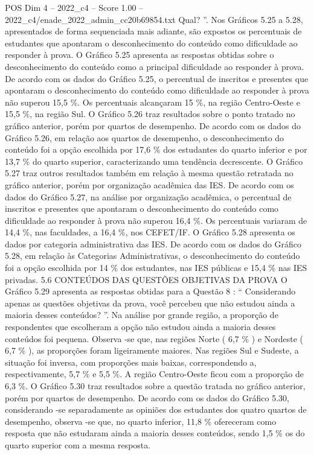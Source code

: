 \begin{textsample}{POS Dim 4 – 2022\_c4 – Score 1.00 – 2022\_c4/enade\_2022\_admin\_cc20b69854.txt}
Qual? ”.
Nos Gráficos 5.25 a 5.28, apresentados de forma sequenciada mais adiante, são expostos os percentuais de estudantes que apontaram o desconhecimento do conteúdo como dificuldade ao responder à prova.
O Gráfico 5.25 apresenta as respostas obtidas sobre o desconhecimento do conteúdo como a principal dificuldade ao responder à prova.
De acordo com os dados do Gráfico 5.25, o percentual de inscritos e presentes que apontaram o desconhecimento do conteúdo como dificuldade ao responder à prova não superou 15,5 \%.
Os percentuais alcançaram 15 \%, na região Centro-Oeste e 15,5 \%, na região Sul.
O Gráfico 5.26 traz resultados sobre o ponto tratado no gráfico anterior, porém por quartos de desempenho.
De acordo com os dados do Gráfico 5.26, em relação aos quartos de desempenho, o desconhecimento do conteúdo foi a opção escolhida por 17,6 \% dos estudantes do quarto inferior e por 13,7 \% do quarto superior, caracterizando uma tendência decrescente.
O Gráfico 5.27 traz outros resultados também em relação à mesma questão retratada no gráfico anterior, porém por organização acadêmica das IES.
De acordo com os dados do Gráfico 5.27, na análise por organização acadêmica, o percentual de inscritos e presentes que apontaram o desconhecimento do conteúdo como dificuldade ao responder à prova não superou 16,4 \%.
Os percentuais variaram de 14,4 \%, nas faculdades, a 16,4 \%, nos CEFET/IF.
O Gráfico 5.28 apresenta os dados por categoria administrativa das IES.
De acordo com os dados do Gráfico 5.28, em relação às Categorias Administrativas, o desconhecimento do conteúdo foi a opção escolhida por 14 \% dos estudantes, nas IES públicas e 15,4 \% nas IES privadas. 5.6 CONTEÚDOS DAS QUESTÕES OBJETIVAS DA PROVA O Gráfico 5.29 apresenta as respostas obtidas para a Questão 8 : “ Considerando apenas as questões objetivas da prova, você percebeu que não estudou ainda a maioria desses conteúdos? ”.
Na análise por grande região, a proporção de respondentes que escolheram a opção não estudou ainda a maioria desses conteúdos foi pequena.
Observa -se que, nas regiões Norte ( 6,7 \% ) e Nordeste ( 6,7 \% ), as proporções foram ligeiramente maiores.
Nas regiões Sul e Sudeste, a situação foi inversa, com proporções mais baixas, correspondendo a, respectivamente, 5,7 \% e 5,5 \%.
A região Centro-Oeste ficou com a proporção de 6,3 \%.
O Gráfico 5.30 traz resultados sobre a questão tratada no gráfico anterior, porém por quartos de desempenho.
De acordo com os dados do Gráfico 5.30, considerando -se separadamente as opiniões dos estudantes dos quatro quartos de desempenho, observa -se que, no quarto inferior, 11,8 \% ofereceram como resposta que não estudaram ainda a maioria desses conteúdos, sendo 1,5 \% os do quarto superior com a mesma resposta.

\end{textsample}

